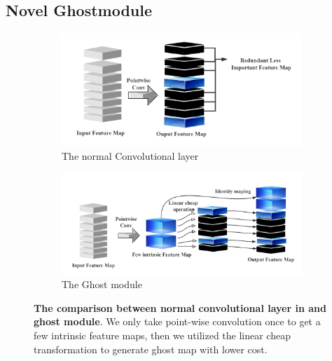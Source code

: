\subsection{Novel Ghostmodule} %
\label{sub:amet}

\begin{figure}[h]
	\begin{center}
		\begin{subfigure}[b]{0.49\textwidth}
		    \centering
			\includegraphics[width=\textwidth]{thesis-template-master/images/normal conv.png}
			\caption{The normal Convolutional layer}
			\label{fig:cellnet}
		\end{subfigure}
		\begin{subfigure}[b]{0.49\textwidth}
		    \centering
			\includegraphics[width=\textwidth]{thesis-template-master/images/ghostmodule.png}
			\caption{The Ghost module}
			\label{fig:cellnet}
		\end{subfigure}
	\end{center}
	\caption{\textbf{The comparison between normal convolutional layer in \cite{b26}\cite{b27}\cite{b28} and ghost module}. We only take point-wise convolution once to get a few intrinsic feature maps, then we utilized the linear cheap transformation to generate ghost map with lower cost.}
\end{figure}

